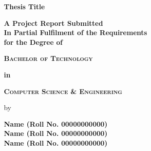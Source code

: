 
\thispagestyle{empty}
\singlespacing
\begin{titlepage}

\begin{center}
    \centering
     
      
  {{\LARGE \textbf{Thesis Title}\par}}
    \vspace{0.8cm}%
     
  \vspace{0.4cm}
    \textbf{ {A Project Report Submitted\\ In Partial Fulfilment of the Requirements\\ for the Degree of \\}}
    \vspace{0.8cm}
    {
   \textsc{\textbf{\large Bachelor of Technology\\}} \par}
   \textbf{\Large in\\} \par
   \textsc{\textbf{\large Computer Science \& Engineering}} \par
    \vspace{0.3cm}


    {\large by\par}
    \vspace{0.3cm}
    {\textbf{{Name} (Roll No. 00000000000)}}\\
    {\textbf{{Name} (Roll No. 00000000000)}}\\
    {\textbf{{Name} (Roll No. 00000000000)}}\\
    \vspace{1.2cm}
    

\end{center}
\end{titlepage}
